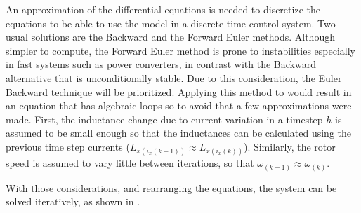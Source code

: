 \documentclass[9pt,conference]{IEEEtran}
\begin{document}
An approximation of the differential equations is needed to discretize the equations to be able to use the model in a discrete time control system. Two usual solutions are the Backward and the Forward Euler methods. Although simpler to compute, the Forward Euler method is prone to instabilities especially in fast systems such as power converters, in contrast with the Backward alternative that is unconditionally stable. Due to this consideration, the Euler Backward technique will be prioritized. Applying this method to  would result in an equation that has algebraic loops so to avoid that a few approximations were made. First, the inductance change due to current variation in a timestep $h$ is assumed to be small enough so that the inductances can be calculated using the previous time step currents ($ L_{x(i_x(k+1))} \approx L_{x(i_x(k))} $). Similarly, the rotor speed is assumed to vary little between iterations, so that $\omega_{(k+1)} \approx \omega_{(k)}$.

With those considerations, and rearranging the equations, the system can be solved iteratively, as shown in .
\end{document}
